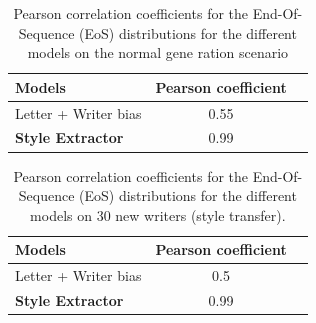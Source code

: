 
  \begin{table}[!htbp]
  \centering
  \begin{tabular}{|l|c|c|}
  \hline
  Models & Pearson coefficient\\ \hline
  Letter + Writer bias & 0.55\\ \hline
  \textbf{Style Extractor} & 0.99 \\ \hline
  \end{tabular}
  \caption{Pearson correlation coefficients for the End-Of-Sequence (EoS) distributions for the different models on the normal gene ration scenario}
  \label{table:EoS_gen}
  \end{table}


  \begin{table}[!htbp]
  \centering
  \begin{tabular}{|l|c|c|}
  \hline
  Models & Pearson coefficient\\ \hline
  Letter + Writer bias & 0.5\\ \hline
  \textbf{Style Extractor} & 0.99\\ \hline
  \end{tabular}
  \caption{Pearson correlation coefficients for the End-Of-Sequence (EoS) distributions for the different models on 30 new writers (style transfer).}
  \label{table:EoS_transfer}
  \end{table}

